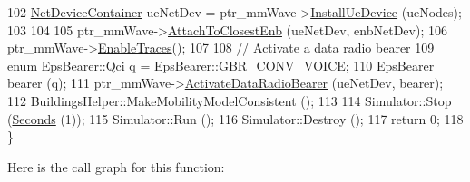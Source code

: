 \begin{DoxyCode}
102   \hyperlink{classns3_1_1NetDeviceContainer}{NetDeviceContainer} ueNetDev = ptr\_mmWave->\hyperlink{classns3_1_1MmWaveHelper_a9311c819d7ee539c8710c5b7e98df37a}{InstallUeDevice} (ueNodes);
103 
104 
105   ptr\_mmWave->\hyperlink{classns3_1_1MmWaveHelper_a202baea67b0af0d4fb6069de73766dc6}{AttachToClosestEnb} (ueNetDev, enbNetDev);
106   ptr\_mmWave->\hyperlink{classns3_1_1MmWaveHelper_a4eae3871876b62965d612d9a56ed21bc}{EnableTraces}();
107 
108   \textcolor{comment}{// Activate a data radio bearer}
109   \textcolor{keyword}{enum} \hyperlink{structns3_1_1EpsBearer_aecf0c67109c5eb4ec0b07226fff5885e}{EpsBearer::Qci} q = EpsBearer::GBR\_CONV\_VOICE;
110   \hyperlink{structns3_1_1EpsBearer}{EpsBearer} bearer (q);
111   ptr\_mmWave->\hyperlink{classns3_1_1MmWaveHelper_a9178ae3493484a9582039bb14edb282a}{ActivateDataRadioBearer} (ueNetDev, bearer);
112   BuildingsHelper::MakeMobilityModelConsistent ();
113 
114   Simulator::Stop (\hyperlink{group__timecivil_ga33c34b816f8ff6628e33d5c8e9713b9e}{Seconds} (1));
115   Simulator::Run ();
116   Simulator::Destroy ();
117   \textcolor{keywordflow}{return} 0;
118 \}
\end{DoxyCode}


Here is the call graph for this function\+:


